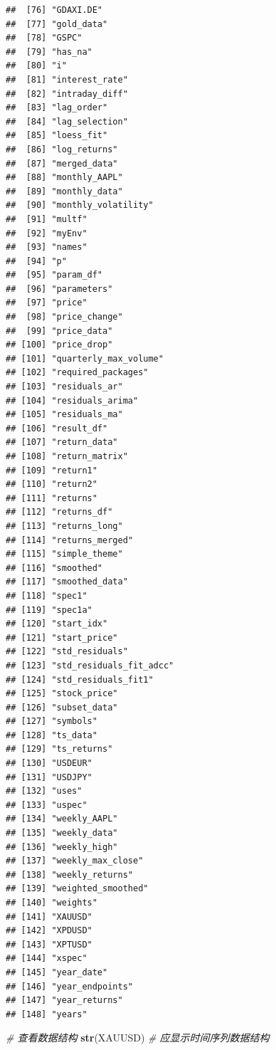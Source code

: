 \documentclass[]{ctexbook}
\newenvironment{Shaded}{\begin{snugshade}}{\end{snugshade}}
\newcommand{\CommentTok}[1]{\textcolor[rgb]{0.56,0.35,0.01}{\textit{#1}}}
\newcommand{\FunctionTok}[1]{\textcolor[rgb]{0.13,0.29,0.53}{\textbf{#1}}}
\newcommand{\NormalTok}[1]{#1}
\begin{document}
\begin{verbatim}
##  [76] "GDAXI.DE"              
##  [77] "gold_data"             
##  [78] "GSPC"                  
##  [79] "has_na"                
##  [80] "i"                     
##  [81] "interest_rate"         
##  [82] "intraday_diff"         
##  [83] "lag_order"             
##  [84] "lag_selection"         
##  [85] "loess_fit"             
##  [86] "log_returns"           
##  [87] "merged_data"           
##  [88] "monthly_AAPL"          
##  [89] "monthly_data"          
##  [90] "monthly_volatility"    
##  [91] "multf"                 
##  [92] "myEnv"                 
##  [93] "names"                 
##  [94] "p"                     
##  [95] "param_df"              
##  [96] "parameters"            
##  [97] "price"                 
##  [98] "price_change"          
##  [99] "price_data"            
## [100] "price_drop"            
## [101] "quarterly_max_volume"  
## [102] "required_packages"     
## [103] "residuals_ar"          
## [104] "residuals_arima"       
## [105] "residuals_ma"          
## [106] "result_df"             
## [107] "return_data"           
## [108] "return_matrix"         
## [109] "return1"               
## [110] "return2"               
## [111] "returns"               
## [112] "returns_df"            
## [113] "returns_long"          
## [114] "returns_merged"        
## [115] "simple_theme"          
## [116] "smoothed"              
## [117] "smoothed_data"         
## [118] "spec1"                 
## [119] "spec1a"                
## [120] "start_idx"             
## [121] "start_price"           
## [122] "std_residuals"         
## [123] "std_residuals_fit_adcc"
## [124] "std_residuals_fit1"    
## [125] "stock_price"           
## [126] "subset_data"           
## [127] "symbols"               
## [128] "ts_data"               
## [129] "ts_returns"            
## [130] "USDEUR"                
## [131] "USDJPY"                
## [132] "uses"                  
## [133] "uspec"                 
## [134] "weekly_AAPL"           
## [135] "weekly_data"           
## [136] "weekly_high"           
## [137] "weekly_max_close"      
## [138] "weekly_returns"        
## [139] "weighted_smoothed"     
## [140] "weights"               
## [141] "XAUUSD"                
## [142] "XPDUSD"                
## [143] "XPTUSD"                
## [144] "xspec"                 
## [145] "year_date"             
## [146] "year_endpoints"        
## [147] "year_returns"          
## [148] "years"
\end{verbatim}

\begin{Shaded}
\begin{Highlighting}[]
\CommentTok{\# 查看数据结构}
\FunctionTok{str}\NormalTok{(XAUUSD)  }\CommentTok{\# 应显示时间序列数据结构}
\end{Highlighting}
\end{Shaded}
\end{document}
